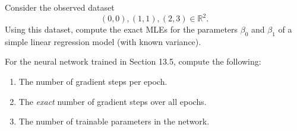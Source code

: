 \documentclass[12pt,reqno]{amsart}
\begin{document}
\newpage
\prob Consider the observed dataset
	\[
	(0, 0), (1, 1), (2,3) \in \mathbb{R}^2.
	\]
Using this dataset, compute the exact MLEs for the parameters $\beta_0$ and $\beta_1$ of a simple linear regression model (with known variance).

\vfill
\prob For the neural network trained in Section 13.5, compute the following:

\bigskip
\begin{enumerate}
\item The number of gradient steps per epoch.\vfill
\item The \textit{exact} number of gradient steps over all epochs.\vfill
\item The number of trainable parameters in the network.\vfill
\end{enumerate}
\end{document}
